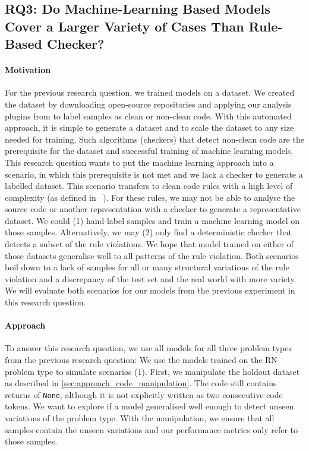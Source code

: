  \subsection{RQ3: Do Machine-Learning Based Models Cover a Larger Variety of Cases Than Rule-Based Checker? }

\paragraph{Motivation}
For the previous research question, we trained models on a dataset. We created the dataset by downloading open-source repositories and applying our analysis plugins from  to label samples as clean or non-clean code. With this automated approach, it is simple to generate a dataset and to scale the dataset to any size needed for training. Such algorithms (checkers) that detect non-clean code are the prerequisite for the dataset and successful training of machine learning models. This research question wants to put the machine learning approach into a scenario, in which this prerequisite is not met and we lack a checker to generate a labelled dataset. 
This scenario transfers to clean code rules with a high level of complexity (as defined in ~). For these rules, we may not be able to analyse the source code or another representation with a checker to generate a representative dataset. We could (1) hand-label samples and train a machine learning model on those samples. Alternatively, we may (2) only find a deterministic checker that detects a subset of the rule violations. We hope that model trained on either of those datasets generalise well to all patterns of the rule violation. Both scenarios boil down to a lack of samples for all or many structural variations of the rule violation and a discrepancy of the test set and the real world with more variety. We will evaluate both scenarios for our models from the previous experiment in this research question.


\paragraph{Approach}
To answer this research question, we use all models for all three problem types from the previous research question: 
We use the models trained on the RN problem type to simulate scenarios (1). First, we manipulate the holdout dataset as described in \ref{sec:approach_code_manipulation}. The code still contains returns of \texttt{None}, although it is not explicitly written as two consecutive code tokens. We want to explore if a model generalised well enough to detect unseen variations of the problem type. With the manipulation, we ensure that all samples contain the unseen variations and our performance metrics only refer to those samples. 

